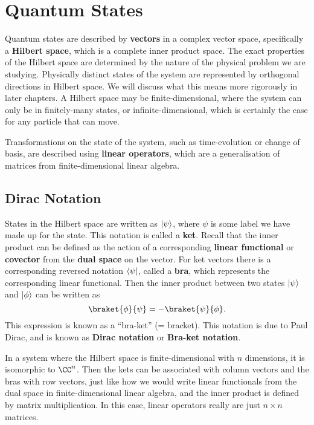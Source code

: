 \documentclass[../quantum_mechanics.tex]{subfiles}
\begin{document}
    \section{Quantum States}\label{sec:quantum-states}
        Quantum states are described by \textbf{vectors} in a complex vector space, specifically a \textbf{Hilbert space}, which is a complete inner product space.
        The exact properties of the Hilbert space are determined by the nature of the physical problem we are studying.
        Physically distinct states of the system are represented by orthogonal directions in Hilbert space.
        We will discuss what this means more rigorously in later chapters.
        A Hilbert space may be finite-dimensional, where the system can only be in finitely-many states, or infinite-dimensional, which is certainly the case for any particle that can move.

        Transformations on the state of the system, such as time-evolution or change of basis, are described using \textbf{linear operators}, which are a generalisation of matrices from finite-dimensional linear algebra.

        \subsection{Dirac Notation}\label{sec:quantum-states:subsec:dirac-notation}
            States in the Hilbert space are written as $\lvert\psi\rangle$, where $\psi$ is some label we have made up for the state.
            This notation is called a \textbf{ket}.
            Recall that the inner product can be defined as the action of a corresponding \textbf{linear functional} or \textbf{covector} from the \textbf{dual space} on the vector.
            For ket vectors there is a corresponding reversed notation $\langle\psi\rvert$, called a \textbf{bra}, which represents the corresponding linear functional.
            Then the inner product between two states $\lvert\psi\rangle$ and $\lvert\phi\rangle$ can be written as
            \begin{equation}
                \braket{\phi}{\psi}=-\braket{\psi}{\phi}.
            \end{equation}
            This expression is known as a ``bra-ket'' (= bracket).
            This notation is due to Paul Dirac, and is known as \textbf{Dirac notation} or \textbf{Bra-ket notation}.

            In a system where the Hilbert space is finite-dimensional with $n$ dimensions, it is isomorphic to $\CC^n$.
            Then the kets can be associated with column vectors and the bras with row vectors, just like how we would write linear functionals from the dual space in finite-dimensional linear algebra, and the inner product is defined by matrix multiplication.
            In this case, linear operators really are just $n\times n$ matrices.
\end{document}
